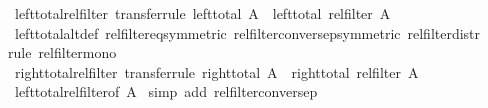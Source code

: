 \begin{isabellebody}
\endisatagproof
{\isafoldproof}%
%
\isadelimproof
\isanewline
%
\endisadelimproof
\isanewline
{}\isamarkupfalse%
\ left{\isacharunderscore}{\kern0pt}total{\isacharunderscore}{\kern0pt}rel{\isacharunderscore}{\kern0pt}filter\ {\isacharbrackleft}{\kern0pt}transfer{\isacharunderscore}{\kern0pt}rule{\isacharbrackright}{\kern0pt}{\isacharcolon}{\kern0pt}\ {\isachardoublequoteopen}left{\isacharunderscore}{\kern0pt}total\ A\ {\isasymLongrightarrow}\ left{\isacharunderscore}{\kern0pt}total\ {\isacharparenleft}{\kern0pt}rel{\isacharunderscore}{\kern0pt}filter\ A{\isacharparenright}{\kern0pt}{\isachardoublequoteclose}\isanewline
%
\isadelimproof
%
\endisadelimproof
%
\isatagproof
{}\isamarkupfalse%
\ left{\isacharunderscore}{\kern0pt}total{\isacharunderscore}{\kern0pt}alt{\isacharunderscore}{\kern0pt}def\ rel{\isacharunderscore}{\kern0pt}filter{\isacharunderscore}{\kern0pt}eq{\isacharbrackleft}{\kern0pt}symmetric{\isacharbrackright}{\kern0pt}\ rel{\isacharunderscore}{\kern0pt}filter{\isacharunderscore}{\kern0pt}conversep{\isacharbrackleft}{\kern0pt}symmetric{\isacharbrackright}{\kern0pt}\ rel{\isacharunderscore}{\kern0pt}filter{\isacharunderscore}{\kern0pt}distr\isanewline
{}\isamarkupfalse%
{\isacharparenleft}{\kern0pt}rule\ rel{\isacharunderscore}{\kern0pt}filter{\isacharunderscore}{\kern0pt}mono{\isacharparenright}{\kern0pt}%
\endisatagproof
{\isafoldproof}%
%
\isadelimproof
\isanewline
%
\endisadelimproof
\isanewline
{}\isamarkupfalse%
\ right{\isacharunderscore}{\kern0pt}total{\isacharunderscore}{\kern0pt}rel{\isacharunderscore}{\kern0pt}filter\ {\isacharbrackleft}{\kern0pt}transfer{\isacharunderscore}{\kern0pt}rule{\isacharbrackright}{\kern0pt}{\isacharcolon}{\kern0pt}\ {\isachardoublequoteopen}right{\isacharunderscore}{\kern0pt}total\ A\ {\isasymLongrightarrow}\ right{\isacharunderscore}{\kern0pt}total\ {\isacharparenleft}{\kern0pt}rel{\isacharunderscore}{\kern0pt}filter\ A{\isacharparenright}{\kern0pt}{\isachardoublequoteclose}\isanewline
%
\isadelimproof
%
\endisadelimproof
%
\isatagproof
{}\isamarkupfalse%
\ left{\isacharunderscore}{\kern0pt}total{\isacharunderscore}{\kern0pt}rel{\isacharunderscore}{\kern0pt}filter{\isacharbrackleft}{\kern0pt}of\ {\isachardoublequoteopen}A{\isasyminverse}{\isasyminverse}{\isachardoublequoteclose}{\isacharbrackright}{\kern0pt}\ \isamarkupfalse%
{\isacharparenleft}{\kern0pt}simp\ add{\isacharcolon}{\kern0pt}\ rel{\isacharunderscore}{\kern0pt}filter{\isacharunderscore}{\kern0pt}conversep{\isacharparenright}{\kern0pt}%
\endisatagproof

\end{isabellebody}
